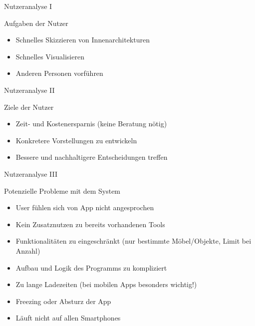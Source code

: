 \documentclass[presentation,bigger,aspectratio=169]{beamer}
\begin{document}
\begin{frame}[label={sec:org7a903e8}]{Nutzeranalyse I}
\begin{block}{Aufgaben der Nutzer}
\begin{itemize}
\item Schnelles Skizzieren von Innenarchitekturen
\item Schnelles Visualisieren
\item Anderen Personen vorführen
\end{itemize}
\end{block}
\end{frame}
\begin{frame}[label={sec:org7934111}]{Nutzeranalyse II}
\begin{block}{Ziele der Nutzer}
\begin{itemize}
\item Zeit- und Kostenersparnis (keine Beratung nötig)
\item Konkretere Vorstellungen zu entwickeln
\item Bessere und nachhaltigere Entscheidungen treffen
\end{itemize}
\end{block}
\end{frame}

\begin{frame}[label={sec:org455f896}]{Nutzeranalyse III}
\begin{block}{Potenzielle Probleme mit dem System}
\begin{itemize}
\item User fühlen sich von App nicht angesprochen
\item Kein Zusatznutzen zu bereits vorhandenen Tools
\item Funktionalitäten zu eingeschränkt (nur bestimmte Möbel/Objekte,
Limit bei Anzahl)
\item Aufbau und Logik des Programms zu kompliziert
\item Zu lange Ladezeiten (bei mobilen Apps besonders wichtig!)
\item Freezing oder Absturz der App
\item Läuft nicht auf allen Smartphones
\end{itemize}
\end{block}
\end{frame}
\end{document}
